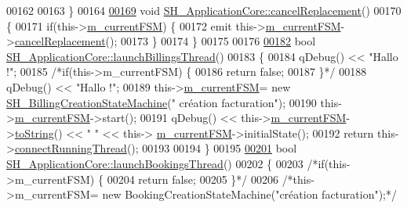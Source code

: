 \begin{DoxyCode}
00162 
00163 \}
00164 
\hypertarget{SH__ApplicationCore_8cpp_source_l00169}{}\hyperlink{classSH__ApplicationCore_a5b788738972737e1d9b52daeb41e8788}{00169} \textcolor{keywordtype}{void} \hyperlink{classSH__ApplicationCore_a5b788738972737e1d9b52daeb41e8788}{SH\_ApplicationCore::cancelReplacement}()
00170 \{
00171     \textcolor{keywordflow}{if}(this->\hyperlink{classSH__ApplicationCore_a1088f3ba13abb8b3989cc0c325524232}{m\_currentFSM}) \{
00172         emit this->\hyperlink{classSH__ApplicationCore_a1088f3ba13abb8b3989cc0c325524232}{m\_currentFSM}->\hyperlink{classSH__InOutStateMachine_a67ce246a765ad91fef76f70ece12213f}{cancelReplacement}();
00173     \}
00174 \}
00175 
00176 
\hypertarget{SH__ApplicationCore_8cpp_source_l00182}{}\hyperlink{classSH__ApplicationCore_a30738281acefd721fe9d06db46dcf123}{00182} \textcolor{keywordtype}{bool} \hyperlink{classSH__ApplicationCore_a30738281acefd721fe9d06db46dcf123}{SH\_ApplicationCore::launchBillingsThread}()
00183 \{
00184     qDebug() << \textcolor{stringliteral}{"Hallo !"};
00185     \textcolor{comment}{/*if(this->m\_currentFSM) \{}
00186 \textcolor{comment}{        return false;}
00187 \textcolor{comment}{    \}*/}
00188     qDebug() << \textcolor{stringliteral}{"Hallo !"};
00189     this->\hyperlink{classSH__ApplicationCore_a1088f3ba13abb8b3989cc0c325524232}{m\_currentFSM}= \textcolor{keyword}{new} \hyperlink{classSH__BillingCreationStateMachine}{SH\_BillingCreationStateMachine}(\textcolor{stringliteral}{"
      création facturation"});
00190     this->\hyperlink{classSH__ApplicationCore_a1088f3ba13abb8b3989cc0c325524232}{m\_currentFSM}->start();
00191     qDebug() << this->\hyperlink{classSH__ApplicationCore_a1088f3ba13abb8b3989cc0c325524232}{m\_currentFSM}->\hyperlink{classSH__InOutStateMachine_a60ecd7de03d948e2d1e9cbedb5c3e5fa}{toString}() << \textcolor{stringliteral}{" "} << this->
      \hyperlink{classSH__ApplicationCore_a1088f3ba13abb8b3989cc0c325524232}{m\_currentFSM}->initialState();
00192     \textcolor{keywordflow}{return} this->\hyperlink{classSH__ApplicationCore_a3a10c2d662707140340d7a827d119c8d}{connectRunningThread}();
00193 
00194 \}
00195 
\hypertarget{SH__ApplicationCore_8cpp_source_l00201}{}\hyperlink{classSH__ApplicationCore_a193a9132da92b5e7a450e9307b657893}{00201} \textcolor{keywordtype}{bool} \hyperlink{classSH__ApplicationCore_a193a9132da92b5e7a450e9307b657893}{SH\_ApplicationCore::launchBookingsThread}()
00202 \{
00203     \textcolor{comment}{/*if(this->m\_currentFSM) \{}
00204 \textcolor{comment}{        return false;}
00205 \textcolor{comment}{    \}*/}
00206     \textcolor{comment}{/*this->m\_currentFSM= new BookingCreationStateMachine("création facturation");*/}

\end{DoxyCode}
